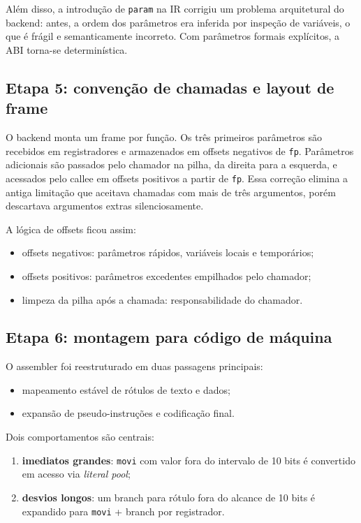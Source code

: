 \documentclass[12pt,a4paper]{article}
\begin{document}
Além disso, a introdução de \texttt{param} na IR corrigiu um problema arquitetural do backend: antes, a ordem dos parâmetros era inferida por inspeção de variáveis, o que é frágil e semanticamente incorreto. Com parâmetros formais explícitos, a ABI torna-se determinística.

\subsection{Etapa 5: convenção de chamadas e layout de frame}
O backend monta um frame por função. Os três primeiros parâmetros são recebidos em registradores e armazenados em offsets negativos de \texttt{fp}. Parâmetros adicionais são passados pelo chamador na pilha, da direita para a esquerda, e acessados pelo callee em offsets positivos a partir de \texttt{fp}. Essa correção elimina a antiga limitação que aceitava chamadas com mais de três argumentos, porém descartava argumentos extras silenciosamente.

A lógica de offsets ficou assim:
\begin{itemize}[leftmargin=1.5em]
    \item offsets negativos: parâmetros rápidos, variáveis locais e temporários;
    \item offsets positivos: parâmetros excedentes empilhados pelo chamador;
    \item limpeza da pilha após a chamada: responsabilidade do chamador.
\end{itemize}

\subsection{Etapa 6: montagem para código de máquina}
O assembler foi reestruturado em duas passagens principais:
\begin{itemize}[leftmargin=1.5em]
    \item mapeamento estável de rótulos de texto e dados;
    \item expansão de pseudo-instruções e codificação final.
\end{itemize}
Dois comportamentos são centrais:
\begin{enumerate}[leftmargin=1.5em]
    \item \textbf{imediatos grandes}: \texttt{movi} com valor fora do intervalo de 10 bits é convertido em acesso via \emph{literal pool};
    \item \textbf{desvios longos}: um branch para rótulo fora do alcance de 10 bits é expandido para \texttt{movi} + branch por registrador.
\end{enumerate}
\end{document}
